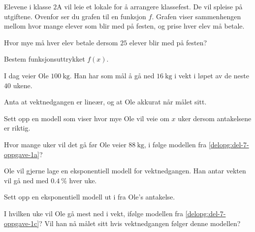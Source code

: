 Elevene i klasse $2$A vil leie et lokale for å arrangere klassefest. De vil
spleise på utgiftene. Ovenfor ser du grafen til en funksjon $f$. Grafen viser
sammenhengen mellom hvor mange elever som blir med på festen, og prise hver elev
må betale.

\begin{oppgaver}
     Hvor mye må hver elev betale dersom $25$ elever blir med på festen?
\end{oppgaver}

\begin{oppgaver}
     Bestem funksjonsuttrykket $f(x)$.
\end{oppgaver}


\Oppgave[7] %

I dag veier Ole $\SI{100}{\kg}$. Han har som mål å gå ned $\SI{16}{\kg}$ i vekt
i løpet av de neste $40$ ukene. \bigskip

Anta at vektnedgangen er lineær, og at Ole akkurat når målet sitt.

\begin{oppgaver}
     Sett opp en modell som viser hvor mye Ole vil veie om $x$ uker
    dersom antakelsene er riktig.
    \label{delopg:del-7-oppgave-1a}
\end{oppgaver}

\begin{oppgaver}
     Hvor mange uker vil det gå før Ole veier $\SI{88}{\kg}$, i følge
    modellen fra \cref{delopg:del-7-oppgave-1a}?
\end{oppgaver}

Ole vil gjerne lage en eksponentiell modell for vektnedgangen. Han antar vekten
vil gå ned med $\SI{0.4}{\percent}$ hver uke.

\begin{oppgaver}
     Sett opp en eksponentiell modell ut i fra Ole's antakelse.
    \label{delopg:del-7-oppgave-1c}
\end{oppgaver}

\begin{oppgaver}
     I hvilken uke vil Ole gå mest ned i vekt, ifølge modellen fra
    \cref{delopg:del-7-oppgave-1c}?
    Vil han nå målet sitt hvis vektnedgangen følger denne modellen?
\end{oppgaver}


\Oppgave[4] %

